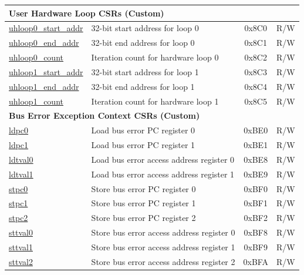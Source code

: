 \begin{longtable}{ | p{4.0cm} | p{8.4cm} | c | l | }
\multicolumn{4}{|l|}{\textbf{User Hardware Loop CSRs (Custom)}} \\\hline
\hyperref[sec:riscvcpu-hwloop-reg-desc]{uhloop0\_start\_addr} & 32-bit start address for loop 0 & 0x8C0 & R/W \\\hline
\hyperref[sec:riscvcpu-hwloop-reg-desc]{uhloop0\_end\_addr} & 32-bit end address for loop 0 & 0x8C1 & R/W \\\hline
\hyperref[sec:riscvcpu-hwloop-reg-desc]{uhloop0\_count} & Iteration count for hardware loop 0 & 0x8C2 & R/W \\\hline
\hyperref[sec:riscvcpu-hwloop-reg-desc]{uhloop1\_start\_addr} & 32-bit start address for loop 1 & 0x8C3 & R/W \\\hline
\hyperref[sec:riscvcpu-hwloop-reg-desc]{uhloop1\_end\_addr} & 32-bit end address for loop 1 & 0x8C4 & R/W \\\hline
\hyperref[sec:riscvcpu-hwloop-reg-desc]{uhloop1\_count} & Iteration count for hardware loop 1 & 0x8C5 & R/W \\\hline

\multicolumn{4}{|l|}{\textbf{Bus Error Exception Context CSRs (Custom)}} \\\hline
\hyperref[regdesc:LDPC0]{ldpc0} & Load bus error PC register 0 & 0xBE0 & R/W \\\hline
\hyperref[regdesc:LDPC1]{ldpc1} & Load bus error PC register 1 & 0xBE1 & R/W \\\hline
\hyperref[regdesc:LDTVAL0]{ldtval0} & Load bus error access address register 0 & 0xBE8 & R/W \\\hline
\hyperref[regdesc:LDTVAL1]{ldtval1} & Load bus error access address register 1 & 0xBE9 & R/W \\\hline
\hyperref[regdesc:STPC0]{stpc0} & Store bus error PC register 0 & 0xBF0 & R/W \\\hline
\hyperref[regdesc:STPC1]{stpc1} & Store bus error PC register 1 & 0xBF1 & R/W \\\hline
\hyperref[regdesc:STPC2]{stpc2} & Store bus error PC register 2 & 0xBF2 & R/W \\\hline
\hyperref[regdesc:STTVAL0]{sttval0} & Store bus error access address register 0 & 0xBF8 & R/W \\\hline
\hyperref[regdesc:STTVAL1]{sttval1} & Store bus error access address register 1 & 0xBF9 & R/W \\\hline
\hyperref[regdesc:STTVAL2]{sttval2} & Store bus error access address register 2 & 0xBFA & R/W \\\hline

\end{longtable}
